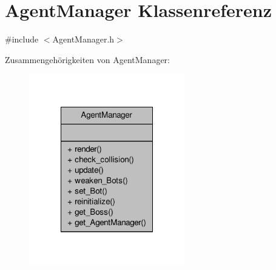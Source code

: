 \hypertarget{class_agent_manager}{\section{Agent\-Manager Klassenreferenz}
\label{class_agent_manager}
}


{\ttfamily \#include $<$Agent\-Manager.\-h$>$}



Zusammengehörigkeiten von Agent\-Manager\-:
\nopagebreak
\begin{figure}[H]
\begin{center}
\leavevmode
\includegraphics[width=192pt]{class_agent_manager__coll__graph}
\end{center}
\end{figure}
